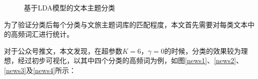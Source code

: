 \documentclass[bwprint]{gmcmthesis}
\begin{document}
\begin{figure}[H]
    \centering
    \hspace{0in}
    \caption{基于LDA模型的文本主题分类}
    \label{lda_fenlei}
\end{figure}

为了验证分类后每个分类与文旅主题词库的匹配程度，本文首先需要对每类文本中的高频词汇进行统计。

对于公众号推文，本文发现，在超参数$K=6$，$\gamma=0$的时候，分类的效果较为理想，经过初步可视化，以其中四个分类的高频词为例，如图\ref{news1}、\ref{news2}、\ref{news3}及\ref{news4}所示：
\end{document}
